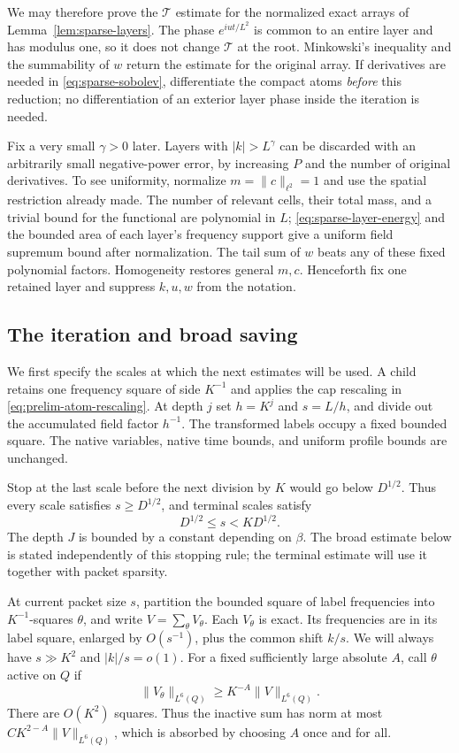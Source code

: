We may therefore prove the $\mathcal T$ estimate for the normalized exact
arrays of Lemma~\ref{lem:sparse-layers}.  The phase $e^{iu t/L^2}$ is
common to an entire layer and has modulus one, so it does not change
$\mathcal T$ at the root.  Minkowski's inequality and the summability of
$w$ return the estimate for the original array.  If derivatives are
needed in \eqref{eq:sparse-sobolev}, differentiate the compact atoms
\emph{before} this reduction; no differentiation of an exterior layer
phase inside the iteration is needed.

Fix a very small $\gamma>0$ later.  Layers with $|k|>L^\gamma$ can be
discarded with an arbitrarily small negative-power error, by increasing
$P$ and the number of original derivatives.  To see uniformity, normalize
$m=\|c\|_{\ell^2}=1$ and use the spatial restriction already made.
The number of relevant cells, their total mass, and a trivial bound for
the functional are polynomial in $L$; \eqref{eq:sparse-layer-energy}
and the bounded area of each layer's frequency support give a uniform
field supremum bound after normalization.  The tail sum of $w$ beats
any of these fixed polynomial factors.  Homogeneity restores general
$m,c$.  Henceforth fix one retained layer and suppress $k,u,w$ from
the notation.

\subsection{The iteration and broad saving}

We first specify the scales at which the next estimates will be used.
A child retains one frequency square of side $K^{-1}$ and applies
the cap rescaling in \eqref{eq:prelim-atom-rescaling}.  At depth $j$
set $h=K^j$ and $s=L/h$, and divide out the accumulated field factor
$h^{-1}$.  The transformed labels occupy a fixed bounded square.
The native variables, native time bounds, and uniform profile bounds
are unchanged.

Stop at the last scale before the next division by $K$ would go below
$D^{1/2}$.  Thus every scale satisfies $s\ge D^{1/2}$, and terminal
scales satisfy
\begin{equation}\label{eq:sparse-terminal-scale}
 D^{1/2}\le s<KD^{1/2}.
\end{equation}
The depth $J$ is bounded by a constant depending on $\beta$.
The broad estimate below is stated independently of this stopping
rule; the terminal estimate will use it together with packet sparsity.

At current packet size $s$, partition the bounded square of label
frequencies into $K^{-1}$-squares $\theta$, and write
$V=\sum_\theta V_\theta$.  Each $V_\theta$ is exact.  Its frequencies
are in its label square, enlarged by $O(s^{-1})$, plus the common shift
$k/s$.  We will always have $s\gg K^2$ and $|k|/s=o(1)$.
For a fixed sufficiently large absolute $A$, call $\theta$ active on
$Q$ if
\begin{equation}\label{eq:sparse-active}
 \|V_\theta\|_{L^6(Q)}
      \ge K^{-A}\|V\|_{L^6(Q)}.
\end{equation}
There are $O(K^2)$ squares.  Thus the inactive sum has norm at most
$C K^{2-A}\|V\|_{L^6(Q)}$, which is absorbed by choosing $A$ once and
for all.

